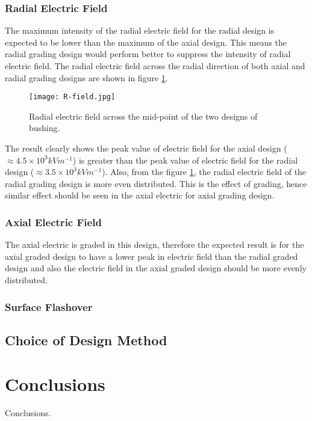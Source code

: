 \subsubsection{Radial Electric Field}
The maximum intensity of the radial electric field for the radial design is expected to be lower than the maximum of the axial design. This means the radial grading design would perform better to suppress the intensity of radial electric field. The radial electric field across the radial direction of both axial and radial grading designs are shown in figure \ref{figure:rfield}.

\begin{figure}[!h]
\centering
\texttt{[image: R-field.jpg]}
\caption{Radial electric field across the mid-point of the two designs of bushing.}
\label{figure:rfield}
\end{figure}

The result clearly shows the peak value of electric field for the axial design ($\approx 4.5 \times 10^3 kVm^{-1}$) is greater than the peak value of electric field for the radial design ($\approx 3.5 \times 10^3 kVm^{-1}$). Also, from the figure \ref{figure:rfield}, the radial electric field of the radial grading design is more even distributed. This is the effect of grading, hence similar effect should be seen in the axial electric for axial grading design.

\subsubsection{Axial Electric Field}
The axial electric is graded in this design, therefore the expected result is for the axial graded design to have a lower peak in electric field than the radial graded design and also the electric field in the axial graded design should be more evenly distributed.

\subsubsection{Surface Flashover}

\subsection{Choice of Design Method}

\section{Conclusions}
Conclusions.